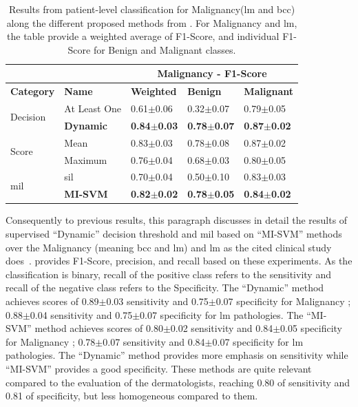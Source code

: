 \documentclass[journal,article,submit,moreauthors,pdftex, applsci]{Definitions/mdpi}
\begin{document}
\begin{table}[h]
    \centering
    \begin{tabular}{lllll}
                                &                   & \multicolumn{3}{c}{\textbf{Malignancy - F1-Score}}                    \\ \hline
    \textbf{Category}           & \textbf{Name}     & \textbf{Weighted}     & \textbf{Benign}       & \textbf{Malignant}    \\ \hline
    \multirow{2}{*}{Decision}   & At Least One      & 0.61$\pm$0.06         & 0.32$\pm$0.07         & 0.79$\pm$0.05         \\ \cline{2-5} 
                                & \textbf{Dynamic}  & \textbf{0.84$\pm$0.03}& \textbf{0.78$\pm$0.07}& \textbf{0.87$\pm$0.02}\\ \hline 
    \multirow{2}{*}{Score}      & Mean              & 0.83$\pm$0.03         & 0.78$\pm$0.08         & 0.87$\pm$0.02         \\ \cline{2-5}
                                & Maximum           & 0.76$\pm$0.04         & 0.68$\pm$0.03         & 0.80$\pm$0.05         \\ \hline  
    \multirow{2}{*}{\ac{mil}}   & \ac{sil}          & 0.70$\pm$0.04         & 0.50$\pm$0.10         & 0.83$\pm$0.03         \\ \cline{2-5} 
                                & \textbf{MI-SVM}   & \textbf{0.82$\pm$0.02}& \textbf{0.78$\pm$0.05}& \textbf{0.84$\pm$0.02}\\ \hline 
    \end{tabular}    
    \caption{Results from patient-level classification for Malignancy(\ac{lm} and \ac{bcc}) along the different proposed methods from . For Malignancy and \ac{lm}, the table provide a weighted average of F1-Score, and individual F1-Score for Benign and Malignant classes.}
    \label{tab:patient_results}
\end{table}\par
Consequently to previous results, this paragraph discusses in detail the results of supervised “Dynamic” decision threshold and \ac{mil} based on “MI-SVM” methods over the Malignancy (meaning \ac{bcc} and \ac{lm}) and \ac{lm} as the cited clinical study does~\cite{Cinotti2018}.  provides F1-Score, precision, and recall based on these experiments. As the classification is binary, recall of the positive class refers to the sensitivity and recall of the negative class refers to the Specificity. The “Dynamic” method achieves scores of 0.89$\pm$0.03 sensitivity and 0.75$\pm$0.07 specificity for Malignancy ; 0.88$\pm$0.04 sensitivity and 0.75$\pm$0.07 specificity for \ac{lm} pathologies. The “MI-SVM” method achieves scores of 0.80$\pm$0.02 sensitivity and 0.84$\pm$0.05 specificity for Malignancy ; 0.78$\pm$0.07 sensitivity and 0.84$\pm$0.07 specificity for \ac{lm} pathologies. The “Dynamic” method provides more emphasis on sensitivity while “MI-SVM” provides a good specificity. These methods are quite relevant compared to the evaluation of the dermatologists, reaching 0.80 of sensitivity and 0.81 of specificity, but less homogeneous compared to them.\par
\end{document}
